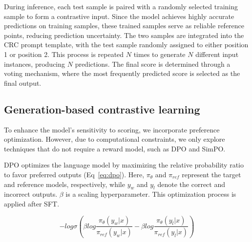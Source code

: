 \documentclass[11pt]{article}
\begin{document}

During inference, each test sample is paired with a randomly selected training sample to form a contrastive input. Since the model achieves highly accurate predictions on training samples, these trained samples serve as reliable reference points, reducing prediction uncertainty. The two samples are integrated into the CRC prompt template, with the test sample randomly assigned to either position 1 or position 2. This process is repeated $N$ times to generate $N$ different input instances, producing $N$ predictions. The final score is determined through a voting mechanism, where the most frequently predicted score is selected as the final output.

\subsection{Generation-based contrastive learning}


To enhance the model’s sensitivity to scoring, we incorporate preference optimization. However, due to computational constraints, we only explore techniques that do not require a reward model, such as DPO and SimPO.


DPO optimizes the language model by maximizing the relative probability ratio to favor preferred outputs (Eq~\ref{eq:dpo}). Here, $\pi_{\theta}$ and $\pi_{ref}$ represent the target and reference models, respectively, while $y_w$ and $y_l$ denote the correct and incorrect outputs. $\beta$ is a scaling hyperparameter. This optimization process is applied after SFT.

\begin{equation}
\label{eq:dpo}
-log\sigma(\beta log \frac{\pi_{\theta}(y_w|x)}{\pi_{ref}(y_w|x)} - \beta log \frac{\pi_{\theta}(y_l|x)}{\pi_{ref}(y_l|x)} )
\end{equation}
\end{document}
